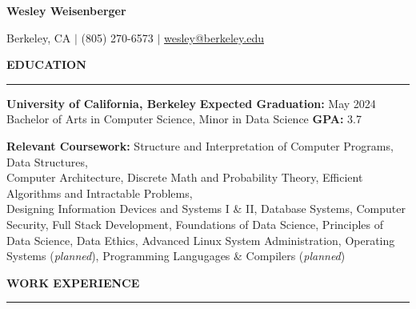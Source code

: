 \documentclass{article}
\begin{document}
\pagestyle{fancy}
\fancyhead{}\fancyfoot{}

\newcommand{\header}[1]{
    \vspace{4mm}
    {\large \noindent \textbf{#1}}
    \vspace{1.5mm}
    \hrule
    \vspace{2mm}
}

\begin{center}

    {\LARGE \textbf{Wesley Weisenberger}}

    \vspace{2mm}

    {\large Berkeley, CA  $\mid$ (805) 270-6573
        $\mid$
        \href{mailto:wesley@berkeley.edu}{wesley@berkeley.edu}

    }

\end{center}


\header{EDUCATION}

\begin{adjustwidth}{1em}{1em}

    \textbf{University of California, Berkeley}
    \hfill
    \textbf{Expected Graduation:} May 2024 \\
    Bachelor of Arts in Computer Science, Minor in Data Science \hfill  \textbf{GPA:} 3.7

    \vspace{2.5mm}

    \textbf{Relevant Coursework:}
    Structure and Interpretation of Computer Programs,
    Data Structures, \\
    Computer Architecture,
    Discrete Math and Probability Theory,
    Efficient Algorithms and Intractable Problems, \\
    Designing Information Devices and Systems I \& II,
    Database Systems,
    Computer Security,
    Full Stack Development,
    Foundations of Data Science,
    Principles of Data Science,
    Data Ethics,
    Advanced Linux System Administration,
    Operating Systems (\textit{planned}),
    Programming Langugages \& Compilers (\textit{planned})

\end{adjustwidth}


\header{WORK EXPERIENCE}
\end{document}
